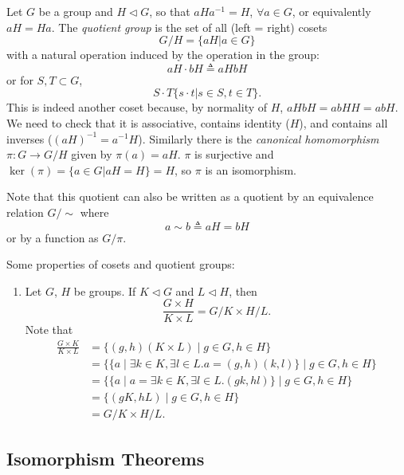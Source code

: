 \begin{defn}
Let $G$ be a group and $H \triangleleft G$, so that $aHa^{-1} = H$,
$\forall a \in G$, or equivalently $aH = Ha$.
The \emph{quotient group} is the set of all (left = right) cosets
$$
G / H = \{ aH | a \in G \}
$$
with a natural operation induced by the operation in the group:
$$
aH \cdot bH \triangleq aHbH
$$
or for $S, T \subset G$,
$$
S \cdot T \{ s \cdot t | s \in S, t \in T \}.
$$
This is indeed another coset because, by normality of $H$,
$aHbH = abHH = abH$. We need to check that it is associative, contains
identity ($H$), and contains all inverses ($(aH)^{-1} = a^{-1}H$).
Similarly there is the
\emph{canonical homomorphism} $\pi : G \to G/H$ given by
$\pi(a) = aH$. $\pi$ is surjective and
$\ker(\pi) = \{ a \in G | aH = H \} = H$, so $\pi$ is an isomorphism.
\end{defn}

Note that this quotient can also be written as a quotient by an
equivalence relation $G/\sim$ where
$$
a \sim b \triangleq aH = bH
$$
or by a function as $G/\pi$.

Some properties of cosets and quotient groups:
\begin{enumerate}
\item{
  Let $G$, $H$ be groups. If $K \triangleleft G$ and $L \triangleleft
  H$, then
  $$
  \frac{G \times H}{K \times L} = G / K \times H / L.
  $$
  Note that
  \begin{align*}
  \frac{G \times K}{K \times L}
  &= \{ (g, h) (K \times L) \mid g \in G, h \in H \} \\
  &= \{ \{ a
           \mid
           \exists k \in K, \exists l \in L .  a = (g, h)(k, l)
        \}
        \mid
        g \in G, h \in H
     \} \\
  &= \{ \{ a \mid a = \exists k \in K, \exists l \in L . (gk, hl) \}
        \mid
        g \in G, h \in H
     \} \\
  &= \{ (g K, h L) \mid g \in G, h \in H \} \\
  &= G / K \times H / L.
  \end{align*}
}
\end{enumerate}

\subsection{Isomorphism Theorems}

